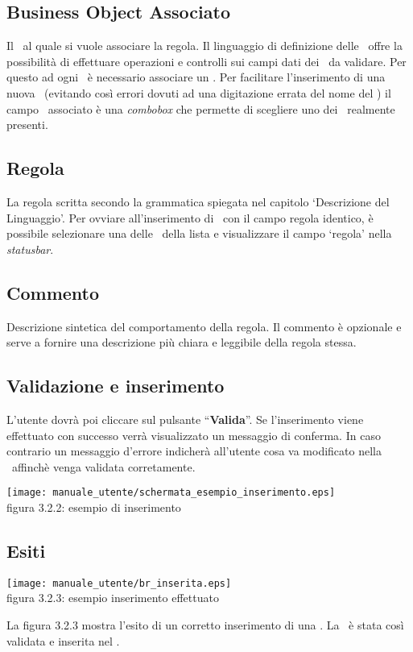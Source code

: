 \subsection{Business Object Associato}
Il \bo\ al quale si vuole associare la regola. Il linguaggio di definizione delle \br\ offre la possibilit\`a di effettuare operazioni e controlli sui campi dati dei \bo\ da validare. Per questo ad ogni \br\ \`e necessario associare un \bo. Per facilitare l'inserimento di una nuova \br\ (evitando cos\`i errori dovuti ad una digitazione errata del nome del \bo) il campo \bo\ associato \`e una \textit{combobox} che permette di scegliere uno dei \bo\ realmente presenti.

\subsection{Regola}
La regola scritta secondo la grammatica spiegata nel capitolo `Descrizione del Linguaggio'. Per ovviare all'inserimento di \br\ con il campo regola identico, \`e possibile selezionare una delle \br\ della lista e visualizzare il campo `regola' nella \textit{statusbar}.

\subsection{Commento}
Descrizione sintetica del comportamento della regola. Il commento \`e opzionale e serve a fornire una descrizione pi\`u chiara e leggibile della regola stessa.

\subsection{Validazione e inserimento}
L'utente dovr\`a poi cliccare sul pulsante ``\textbf{Valida}''. Se l'inserimento viene effettuato con successo verr\`a visualizzato un messaggio di conferma. In caso contrario un messaggio d'errore indicher\`a all'utente cosa va modificato nella \br\ affinch\`e venga validata corretamente.
\begin{center}
\texttt{[image: manuale\_utente/schermata\_esempio\_inserimento.eps]}\\
 figura 3.2.2: esempio di inserimento
\end{center} 
\subsection{Esiti}
\begin{center}
\texttt{[image: manuale\_utente/br\_inserita.eps]}\\
 figura 3.2.3: esempio inserimento effettuato
\end{center} 
La figura 3.2.3 mostra l'esito di un corretto inserimento di una \br. La \br\ \`e stata cos\`i validata e inserita nel \rp.

